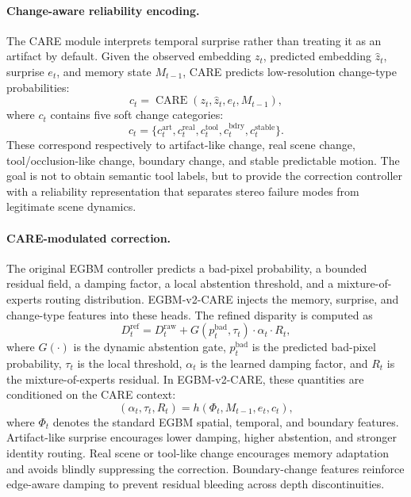 \documentclass[11pt,a4paper]{article}
\begin{document}
\paragraph{Change-aware reliability encoding.}
The CARE module interprets temporal surprise rather than treating it as an
artifact by default. Given the observed embedding $z_t$, predicted embedding
$\hat{z}_t$, surprise $e_t$, and memory state $M_{t-1}$, CARE predicts
low-resolution change-type probabilities:
\begin{equation}
    c_t =
    \operatorname{CARE}(z_t, \hat{z}_t, e_t, M_{t-1}),
\end{equation}
where $c_t$ contains five soft change categories:
\begin{equation}
    c_t =
    \{c_t^{\mathrm{art}},
      c_t^{\mathrm{real}},
      c_t^{\mathrm{tool}},
      c_t^{\mathrm{bdry}},
      c_t^{\mathrm{stable}}\}.
\end{equation}
These correspond respectively to artifact-like change, real scene change,
tool/occlusion-like change, boundary change, and stable predictable motion. The
goal is not to obtain semantic tool labels, but to provide the correction
controller with a reliability representation that separates stereo failure modes
from legitimate scene dynamics.

\paragraph{CARE-modulated correction.}
The original EGBM controller predicts a bad-pixel probability, a bounded residual
field, a damping factor, a local abstention threshold, and a mixture-of-experts
routing distribution. EGBM-v2-CARE injects the memory, surprise, and change-type
features into these heads. The refined disparity is computed as
\begin{equation}
    D_t^{\mathrm{ref}} =
    D_t^{\mathrm{raw}} +
    G(p_t^{\mathrm{bad}}, \tau_t)
    \cdot
    \alpha_t
    \cdot
    R_t,
\end{equation}
where $G(\cdot)$ is the dynamic abstention gate, $p_t^{\mathrm{bad}}$ is the
predicted bad-pixel probability, $\tau_t$ is the local threshold, $\alpha_t$ is
the learned damping factor, and $R_t$ is the mixture-of-experts residual. In
EGBM-v2-CARE, these quantities are conditioned on the CARE context:
\begin{equation}
    (\alpha_t, \tau_t, R_t)
    =
    h(\Phi_t, M_{t-1}, e_t, c_t),
\end{equation}
where $\Phi_t$ denotes the standard EGBM spatial, temporal, and boundary
features. Artifact-like surprise encourages lower damping, higher abstention,
and stronger identity routing. Real scene or tool-like change encourages memory
adaptation and avoids blindly suppressing the correction. Boundary-change
features reinforce edge-aware damping to prevent residual bleeding across depth
discontinuities.
\end{document}
